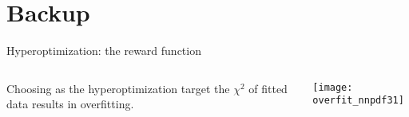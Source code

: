 
\appendix

\section{Backup}


\begin{frame}[t]{Hyperoptimization: the reward function}
    \begin{columns}[T]
        \begin{column}{0.48\textwidth}
            \vspace{\topsep}
            Choosing as the hyperoptimization target the $\chi^2$ of fitted data results in overfitting.
        \end{column}
        \begin{column}{0.48\textwidth}
            \texttt{[image: overfit\_nnpdf31]}
        \end{column}
    \end{columns}
\end{frame}



